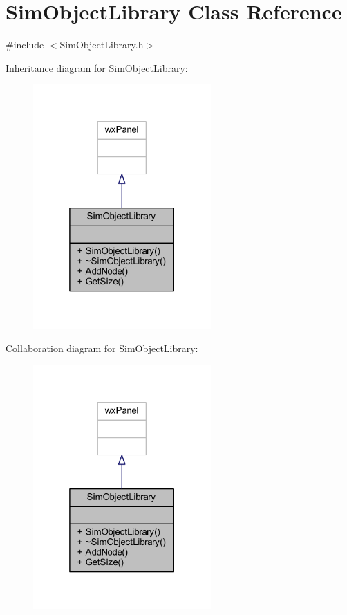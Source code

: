 \hypertarget{class_sim_object_library}{}\section{Sim\+Object\+Library Class Reference}
\label{class_sim_object_library}


{\ttfamily \#include $<$Sim\+Object\+Library.\+h$>$}



Inheritance diagram for Sim\+Object\+Library\+:\nopagebreak
\begin{figure}[H]
\begin{center}
\leavevmode
\includegraphics[width=193pt]{class_sim_object_library__inherit__graph}
\end{center}
\end{figure}


Collaboration diagram for Sim\+Object\+Library\+:\nopagebreak
\begin{figure}[H]
\begin{center}
\leavevmode
\includegraphics[width=193pt]{class_sim_object_library__coll__graph}
\end{center}
\end{figure}
